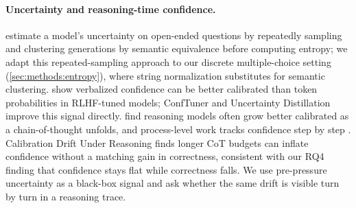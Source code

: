 \paragraph{Uncertainty and reasoning-time confidence.} \citet{kuhn2023semanticuncertaintylinguisticinvariances} estimate a model's uncertainty on open-ended questions by repeatedly sampling and clustering generations by semantic equivalence before computing entropy; we adapt this repeated-sampling approach to our discrete multiple-choice setting (\autoref{sec:methods:entropy}), where string normalization substitutes for semantic clustering. \citet{tian2023justask} show verbalized confidence can be better calibrated than token probabilities in RLHF-tuned models; ConfTuner \citep{li2025conftuner} and Uncertainty Distillation \citep{hager2025uncertaintydistillationteachinglanguage} improve this signal directly. \citet{yoon2025reasoningconfidence} find reasoning models often grow better calibrated as a chain-of-thought unfolds, and process-level work tracks confidence step by step \citep{mao2025temporalizingconfidence,wu2025thoughtcalibration,park2025knowwhatyoudontknow,guo2026llmsshouldexpressuncertainty}. Calibration Drift Under Reasoning \citep{hiremath2026calibrationdrift} finds longer CoT budgets can inflate confidence without a matching gain in correctness, consistent with our RQ4 finding that confidence stays flat while correctness falls. We use pre-pressure uncertainty as a black-box signal and ask whether the same drift is visible turn by turn in a reasoning trace.
